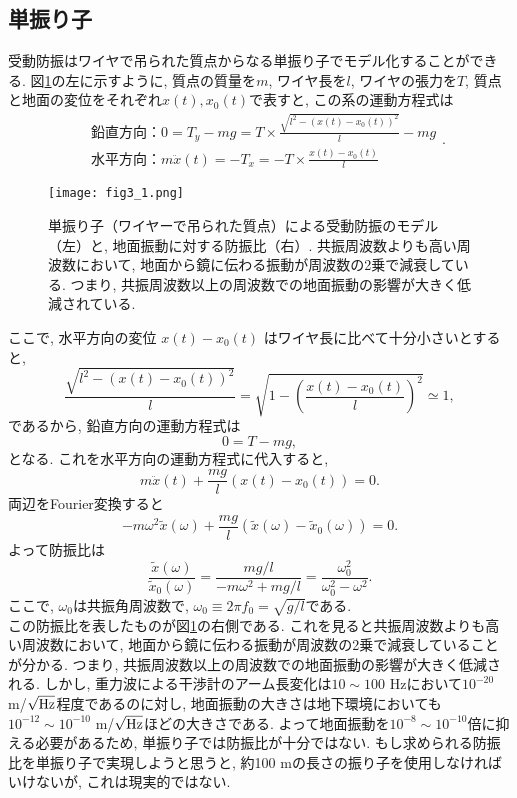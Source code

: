 \subsection{単振り子}
受動防振はワイヤで吊られた質点からなる単振り子でモデル化することができる. 図\ref{fig3.1}の左に示すように, 質点の質量を$m$, ワイヤ長を$l$, ワイヤの張力を$T$, 質点と地面の変位をそれぞれ$x(t),x_0(t)$で表すと, この系の運動方程式は
\begin{equation}
\begin{split}
&鉛直方向：0=T_y-mg=T\times\frac{\sqrt{l^2-(x(t)-x_0(t))^2}}{l}-mg\\
&水平方向：m\ddot{x}(t)=-T_x=-T\times\frac{x(t)-x_0(t)}{l}
\end{split}.
\end{equation}
\begin{figure}[H]
\begin{center}
\texttt{[image: fig3\_1.png]}
\caption[単振り子による受動防振のモデルと地面振動に対する防振比]{単振り子（ワイヤーで吊られた質点）による受動防振のモデル（左）と, 地面振動に対する防振比（右）. 共振周波数よりも高い周波数において, 地面から鏡に伝わる振動が周波数の2乗で減衰している. つまり, 共振周波数以上の周波数での地面振動の影響が大きく低減されている. }
\label{fig3.1}
\end{center}
\end{figure}
ここで, 水平方向の変位 $x(t)-x_0(t)$ はワイヤ長に比べて十分小さいとすると, 
\begin{equation}
\frac{\sqrt{l^2-(x(t)-x_0(t))^2}}{l}=\sqrt{1-\left(\frac{x(t)-x_0(t)}{l}\right)^2}\simeq 1,
\end{equation}
であるから, 鉛直方向の運動方程式は
\begin{equation}
0=T-mg,
\end{equation}
となる. これを水平方向の運動方程式に代入すると, 
\begin{equation}
m\ddot{x}(t)+\frac{mg}{l}(x(t)-x_0(t))=0.
\end{equation}
両辺をFourier変換すると
\begin{equation}
-m\omega^2\tilde{x}(\omega)+\frac{mg}{l}\left(\tilde{x}(\omega)-\tilde{x}_0(\omega)\right)=0.
\end{equation}
よって防振比は
\begin{equation}
\frac{\tilde{x}(\omega)}{\tilde{x}_0(\omega)}=\frac{mg/l}{-m\omega^2+mg/l}=\frac{\omega_0^2}{\omega_0^2-\omega^2}.
\end{equation}
ここで, $\omega_0$は共振角周波数で, $\omega_0\equiv2\pi f_0=\sqrt{g/l}$である. \\
\quad この防振比を表したものが図\ref{fig3.1}の右側である. これを見ると共振周波数よりも高い周波数において, 地面から鏡に伝わる振動が周波数の2乗で減衰していることが分かる. つまり, 共振周波数以上の周波数での地面振動の影響が大きく低減される. しかし, 重力波による干渉計のアーム長変化は$10\sim100$ Hzにおいて$10^{-20}$ m/$\sqrt{\rm Hz}$程度であるのに対し, 地面振動の大きさは地下環境においても$10^{-12}\sim10^{-10}$ m/$\sqrt{\rm Hz}$ほどの大きさである\cite{17}. よって地面振動を$10^{-8}\sim10^{-10}$倍に抑える必要があるため, 単振り子では防振比が十分ではない. もし求められる防振比を単振り子で実現しようと思うと, 約100 mの長さの振り子を使用しなければいけないが, これは現実的ではない. 
